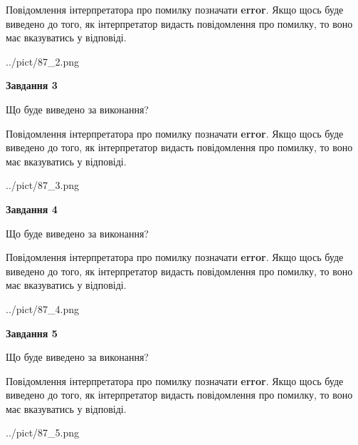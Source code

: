 \documentclass[12pt, ukrainian]{article}
\begin{document}
{\begin {large}
Повідомлення інтерпретатора про помилку позначати \textbf{error}.
Якщо щось буде виведено до того, як інтерпретатор видасть повідомлення про помилку, 
то воно має вказуватись у відповіді. \par


\begin{center}
	{../pict/87_2.png}
\end{center}
\newpage

{\begin {center}\textbf{Завдання 3}\end {center}}\par
Що буде виведено за виконання?

Повідомлення інтерпретатора про помилку позначати \textbf{error}.
Якщо щось буде виведено до того, як інтерпретатор видасть повідомлення про помилку, 
то воно має вказуватись у відповіді. \par


\begin{center}
	{../pict/87_3.png}
\end{center}
\newpage

{\begin {center}\textbf{Завдання 4}\end {center}}\par
Що буде виведено за виконання?

Повідомлення інтерпретатора про помилку позначати \textbf{error}.
Якщо щось буде виведено до того, як інтерпретатор видасть повідомлення про помилку, 
то воно має вказуватись у відповіді. \par


\begin{center}
	{../pict/87_4.png}
\end{center}
\newpage

{\begin {center}\textbf{Завдання 5}\end {center}}\par
Що буде виведено за виконання?

Повідомлення інтерпретатора про помилку позначати \textbf{error}.
Якщо щось буде виведено до того, як інтерпретатор видасть повідомлення про помилку, 
то воно має вказуватись у відповіді. \par


\begin{center}
	{../pict/87_5.png}
\end{center}
\newpage


\end{large}}
\end{document}
